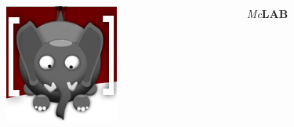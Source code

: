 
\begin{frame}
  \begin{columns}
    \begin{column}{5cm}
      \begin{center}
        \includegraphics[scale=0.6]{images/logo}
      \end{center}
    \end{column}
    \begin{column}{5cm}
      {\Huge\textcolor[RGB]{139,0,0}{\emph{Mc}\textbf{LAB}}}
    \end{column}
  \end{columns}
\end{frame}
